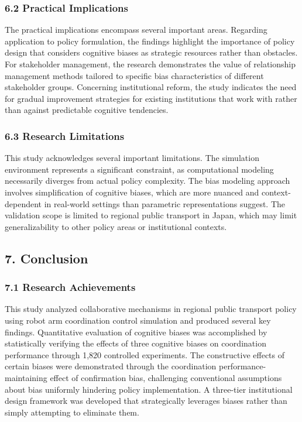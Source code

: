 \subsubsection{6.2 Practical Implications}\label{practical-implications}

The practical implications encompass several important areas. Regarding application to policy formulation, the findings highlight the importance of policy design that considers cognitive biases as strategic resources rather than obstacles. For stakeholder management, the research demonstrates the value of relationship management methods tailored to specific bias characteristics of different stakeholder groups. Concerning institutional reform, the study indicates the need for gradual improvement strategies for existing institutions that work with rather than against predictable cognitive tendencies.

\subsubsection{6.3 Research Limitations}\label{research-limitations}

This study acknowledges several important limitations. The simulation environment represents a significant constraint, as computational modeling necessarily diverges from actual policy complexity. The bias modeling approach involves simplification of cognitive biases, which are more nuanced and context-dependent in real-world settings than parametric representations suggest. The validation scope is limited to regional public transport in Japan, which may limit generalizability to other policy areas or institutional contexts.

\subsection{7. Conclusion}\label{conclusion}

\subsubsection{7.1 Research Achievements}\label{research-achievements}

This study analyzed collaborative mechanisms in regional public transport policy using robot arm coordination control simulation and produced several key findings. Quantitative evaluation of cognitive biases was accomplished by statistically verifying the effects of three cognitive biases on coordination performance through 1,820 controlled experiments. The constructive effects of certain biases were demonstrated through the coordination performance-maintaining effect of confirmation bias, challenging conventional assumptions about bias uniformly hindering policy implementation. A three-tier institutional design framework was developed that strategically leverages biases rather than simply attempting to eliminate them.

